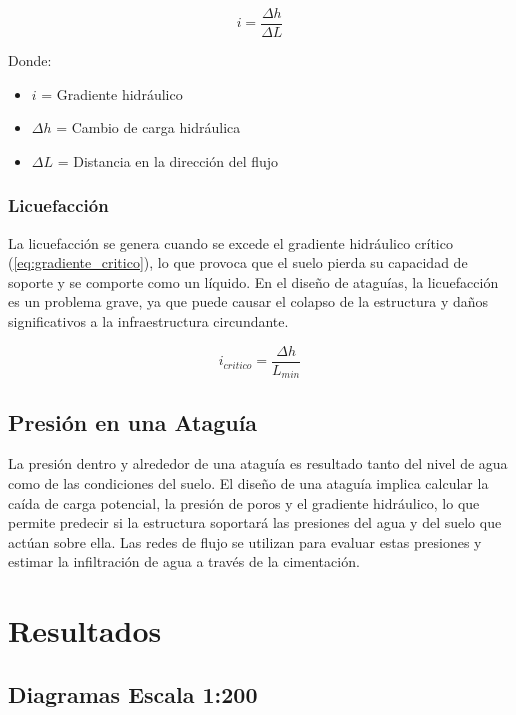 \begin{equation}
    i = \frac{\Delta h}{\Delta L}
    \label{eq:gradiente_hidraulico}
\end{equation}

Donde:
\begin{itemize}
    \item $i$ = Gradiente hidráulico
    \item $\Delta h$ = Cambio de carga hidráulica
    \item $\Delta L$ = Distancia en la dirección del flujo
\end{itemize}

\subsubsection{Licuefacción}
La licuefacción se genera cuando se excede el gradiente hidráulico crítico (\ref{eq:gradiente_critico}), lo que provoca que el suelo pierda su capacidad de soporte y se comporte como un líquido. En el diseño de ataguías, la licuefacción es un problema grave, ya que puede causar el colapso de la estructura y daños significativos a la infraestructura circundante. \textbf{\cite{budhu_soil_2010}}

\begin{equation}
    i_{critico} = \frac{\Delta h}{L_{min}}
    \label{eq:gradiente_critico}
\end{equation}

\subsection{Presión en una Ataguía}
La presión dentro y alrededor de una ataguía es resultado tanto del nivel de agua como de las condiciones del suelo. El diseño de una ataguía implica calcular la caída de carga potencial, la presión de poros y el gradiente hidráulico, lo que permite predecir si la estructura soportará las presiones del agua y del suelo que actúan sobre ella. Las redes de flujo se utilizan para evaluar estas presiones y estimar la infiltración de agua a través de la cimentación. \cite{sivakugan2005}

\section{Resultados}

\subsection{Diagramas Escala 1:200}

